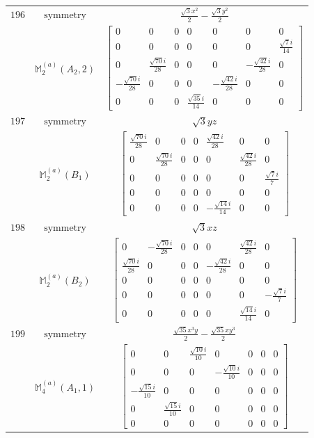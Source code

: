 \documentclass[fleqn,8pt,landscape]{jsarticle}
\begin{document}
\begin{longtable}{ccc}
$ 196 $ & $ \text{symmetry} $ & $ \frac{\sqrt{3} x^{2}}{2} - \frac{\sqrt{3} y^{2}}{2} $ \\
$  $ & $ \mathbb{M}_{2}^{(a)}(A_{2},2) $ & $ \begin{bmatrix} 0 & 0 & 0 & 0 & 0 & 0 & 0 \\ 0 & 0 & 0 & 0 & 0 & 0 & \frac{\sqrt{7} i}{14} \\ 0 & \frac{\sqrt{70} i}{28} & 0 & 0 & 0 & - \frac{\sqrt{42} i}{28} & 0 \\ - \frac{\sqrt{70} i}{28} & 0 & 0 & 0 & - \frac{\sqrt{42} i}{28} & 0 & 0 \\ 0 & 0 & 0 & \frac{\sqrt{35} i}{14} & 0 & 0 & 0 \end{bmatrix} $ \\ \hline
$ 197 $ & $ \text{symmetry} $ & $ \sqrt{3} y z $ \\
$  $ & $ \mathbb{M}_{2}^{(a)}(B_{1}) $ & $ \begin{bmatrix} \frac{\sqrt{70} i}{28} & 0 & 0 & 0 & \frac{\sqrt{42} i}{28} & 0 & 0 \\ 0 & \frac{\sqrt{70} i}{28} & 0 & 0 & 0 & \frac{\sqrt{42} i}{28} & 0 \\ 0 & 0 & 0 & 0 & 0 & 0 & \frac{\sqrt{7} i}{7} \\ 0 & 0 & 0 & 0 & 0 & 0 & 0 \\ 0 & 0 & 0 & 0 & - \frac{\sqrt{14} i}{14} & 0 & 0 \end{bmatrix} $ \\ \hline
$ 198 $ & $ \text{symmetry} $ & $ \sqrt{3} x z $ \\
$  $ & $ \mathbb{M}_{2}^{(a)}(B_{2}) $ & $ \begin{bmatrix} 0 & - \frac{\sqrt{70} i}{28} & 0 & 0 & 0 & \frac{\sqrt{42} i}{28} & 0 \\ \frac{\sqrt{70} i}{28} & 0 & 0 & 0 & - \frac{\sqrt{42} i}{28} & 0 & 0 \\ 0 & 0 & 0 & 0 & 0 & 0 & 0 \\ 0 & 0 & 0 & 0 & 0 & 0 & - \frac{\sqrt{7} i}{7} \\ 0 & 0 & 0 & 0 & 0 & \frac{\sqrt{14} i}{14} & 0 \end{bmatrix} $ \\ \hline
$ 199 $ & $ \text{symmetry} $ & $ \frac{\sqrt{35} x^{3} y}{2} - \frac{\sqrt{35} x y^{3}}{2} $ \\
$  $ & $ \mathbb{M}_{4}^{(a)}(A_{1},1) $ & $ \begin{bmatrix} 0 & 0 & \frac{\sqrt{10} i}{10} & 0 & 0 & 0 & 0 \\ 0 & 0 & 0 & - \frac{\sqrt{10} i}{10} & 0 & 0 & 0 \\ - \frac{\sqrt{15} i}{10} & 0 & 0 & 0 & 0 & 0 & 0 \\ 0 & \frac{\sqrt{15} i}{10} & 0 & 0 & 0 & 0 & 0 \\ 0 & 0 & 0 & 0 & 0 & 0 & 0 \end{bmatrix} $ \\ \hline

\end{longtable}
\end{document}
